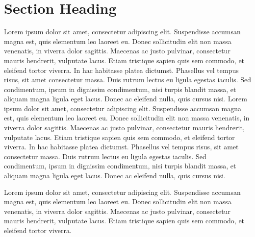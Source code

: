 \documentclass{winnower}
\begin{document}
\section{Section Heading}

Lorem ipsum dolor sit amet, consectetur adipiscing elit. Suspendisse accumsan magna est, quis elementum leo laoreet eu. Donec sollicitudin elit non massa venenatis, in viverra dolor sagittis. Maecenas ac justo pulvinar, consectetur mauris hendrerit, vulputate lacus. Etiam tristique sapien quis sem commodo, et eleifend tortor viverra. In hac habitasse platea dictumst. Phasellus vel tempus risus, sit amet consectetur massa. Duis rutrum lectus eu ligula egestas iaculis. Sed condimentum, ipsum in dignissim condimentum, nisi turpis blandit massa, et aliquam magna ligula eget lacus. Donec ac eleifend nulla, quis cursus nisi. Lorem ipsum dolor sit amet, consectetur adipiscing elit. Suspendisse accumsan magna est, quis elementum leo laoreet eu. Donec sollicitudin elit non massa venenatis, in viverra dolor sagittis. Maecenas ac justo pulvinar, consectetur mauris hendrerit, vulputate lacus. Etiam tristique sapien quis sem commodo, et eleifend tortor viverra. In hac habitasse platea dictumst. Phasellus vel tempus risus, sit amet consectetur massa. Duis rutrum lectus eu ligula egestas iaculis. Sed condimentum, ipsum in dignissim condimentum, nisi turpis blandit massa, et aliquam magna ligula eget lacus. Donec ac eleifend nulla, quis cursus nisi.
\fi

\acknowledgments 
Lorem ipsum dolor sit amet, consectetur adipiscing elit. Suspendisse accumsan magna est, quis elementum leo laoreet eu. Donec sollicitudin elit non massa venenatis, in viverra dolor sagittis. Maecenas ac justo pulvinar, consectetur mauris hendrerit, vulputate lacus. Etiam tristique sapien quis sem commodo, et eleifend tortor viverra.



\appendix
\end{document}
